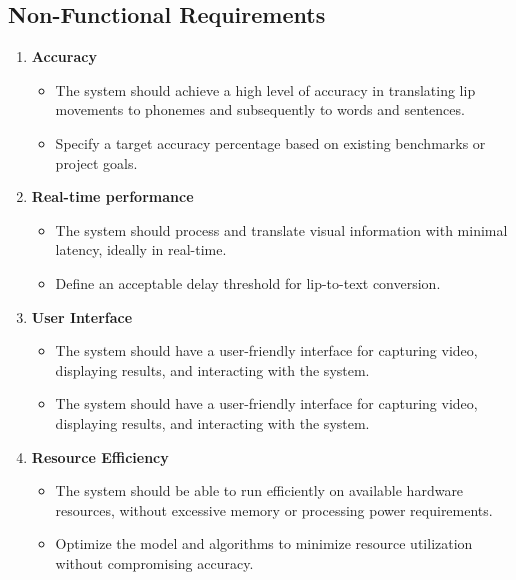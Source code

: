 \subsection{Non-Functional Requirements}
\begin{enumerate}
\item \textbf{Accuracy}
\begin{itemize}
\item The system should achieve a high level of accuracy in translating lip movements to phonemes and subsequently to words and sentences.  
\item Specify a target accuracy percentage based on existing benchmarks or project goals. 


\end{itemize}
\item \textbf{Real-time performance}
\begin{itemize}
\item The system should process and translate visual information with minimal latency, ideally in real-time.  
\item Define an acceptable delay threshold for lip-to-text conversion. 




\end{itemize}
\item \textbf{User Interface}
\begin{itemize}
\item The system should have a user-friendly interface for capturing video, displaying results, and interacting with the system.   
\item The system should have a user-friendly interface for capturing video, displaying results, and interacting with the system. 


\end{itemize}

\item \textbf{Resource Efficiency}
\begin{itemize}
\item The system should be able to run efficiently on available hardware resources, without excessive memory or processing power requirements.    
\item Optimize the model and algorithms to minimize resource utilization without compromising accuracy.


\end{itemize}

\end{enumerate}

